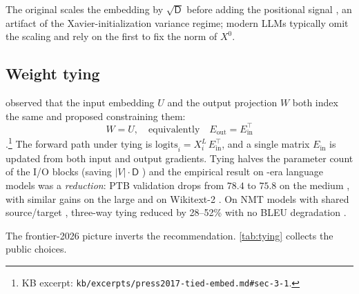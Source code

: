 The original   scales the embedding by
$\sqrt{\mathsf{D}}$ before adding the positional signal
\citep[\S 3.4]{vaswani2017}, an artifact of the Xavier-initialization
variance regime; modern  LLMs typically omit the scaling
and rely on the first  to fix the norm of $X^0$.

\subsection{Weight tying}
\label{sec:tok-tying}

\citet{press2017-tied-embed} observed that the input embedding $U$ and
the output projection $W$ both index the same  and proposed
constraining them:
\begin{equation}
W = U, \quad \text{equivalently} \quad E_{\text{out}} = E_{\text{in}}^\top
\label{eq:tying}
\end{equation}
\citep[\S 3.1]{press2017-tied-embed}.\footnote{KB excerpt:
\nolinkurl{kb/excerpts/press2017-tied-embed.md#sec-3-1}.} The forward path
under tying is $\mathrm{logits}_i = X^L_i \, E_{\text{in}}^\top$, and a
single matrix $E_{\text{in}}$ is updated from both input and output
gradients. Tying halves the parameter count of the I/O blocks (saving
$|V| \cdot \mathsf{D}$ ) and the empirical result on -era
language models was a  \emph{reduction}: PTB validation drops
from $78.4$ to $75.8$ on the medium , with similar gains on the
large  and on Wikitext-2 \citep[\S 4]{press2017-tied-embed}. On NMT
 models with shared source/target , three-way
tying reduced  by 28--52\% with no BLEU degradation
\citep[\S 5]{press2017-tied-embed}.

The frontier-2026 picture inverts the recommendation. \cref{tab:tying}
collects the public choices.

